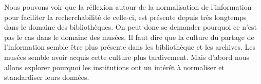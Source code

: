Nous pouvons voir que la réflexion autour de la normalisation de l’information pour faciliter la recherchabilité de celle-ci, est présente depuis très longtemps dans le domaine des bibliothèques. On peut donc se demander pourquoi ce n’est pas le cas dans le domaine des musées. Il faut dire que la culture du partage de l'information semble être plus présente dans les bibliothèque et les archives. Les musées semble avoir acquis cette culture plus tardivement. \newline
Mais d’abord nous allons explorer pourquoi les institutions ont un intérêt à normaliser et standardiser leurs données.

